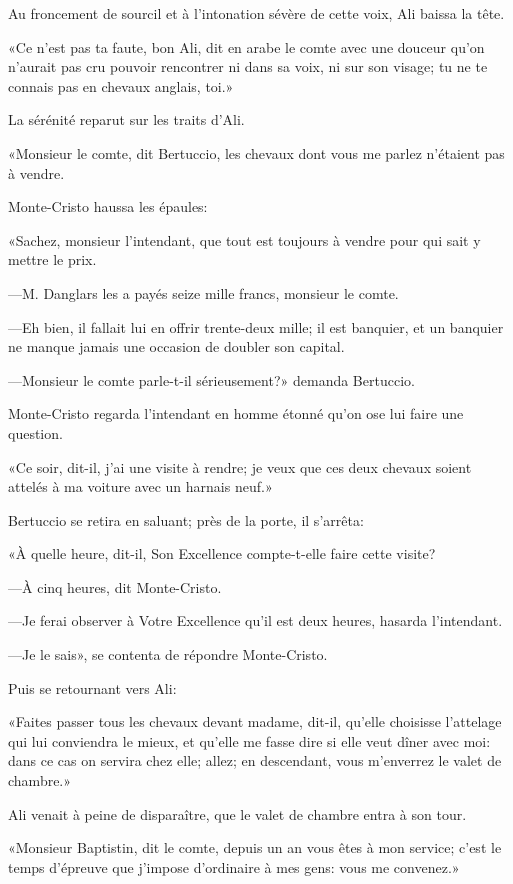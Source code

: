 Au froncement de sourcil et à l'intonation sévère de cette voix, Ali baissa la tête. 

«Ce n'est pas ta faute, bon Ali, dit en arabe le comte avec une douceur qu'on n'aurait pas cru pouvoir rencontrer ni dans sa voix, ni sur son visage; tu ne te connais pas en chevaux anglais, toi.» 

La sérénité reparut sur les traits d'Ali. 

«Monsieur le comte, dit Bertuccio, les chevaux dont vous me parlez n'étaient pas à vendre. 

Monte-Cristo haussa les épaules: 

«Sachez, monsieur l'intendant, que tout est toujours à vendre pour qui sait y mettre le prix. 

—M. Danglars les a payés seize mille francs, monsieur le comte.  

—Eh bien, il fallait lui en offrir trente-deux mille; il est banquier, et un banquier ne manque jamais une occasion de doubler son capital. 

—Monsieur le comte parle-t-il sérieusement?» demanda Bertuccio. 

Monte-Cristo regarda l'intendant en homme étonné qu'on ose lui faire une question. 

«Ce soir, dit-il, j'ai une visite à rendre; je veux que ces deux chevaux soient attelés à ma voiture avec un harnais neuf.» 

Bertuccio se retira en saluant; près de la porte, il s'arrêta:  

«À quelle heure, dit-il, Son Excellence compte-t-elle faire cette visite? 

—À cinq heures, dit Monte-Cristo. 

—Je ferai observer à Votre Excellence qu'il est deux heures, hasarda l'intendant. 

—Je le sais», se contenta de répondre Monte-Cristo. 

Puis se retournant vers Ali: 

«Faites passer tous les chevaux devant madame, dit-il, qu'elle choisisse l'attelage qui lui conviendra le mieux, et qu'elle me fasse dire si elle veut dîner avec moi: dans ce cas on servira chez elle; allez; en descendant, vous m'enverrez le valet de chambre.» 

Ali venait à peine de disparaître, que le valet de chambre entra à son tour. 

«Monsieur Baptistin, dit le comte, depuis un an vous êtes à mon service; c'est le temps d'épreuve que j'impose d'ordinaire à mes gens: vous me convenez.» 

